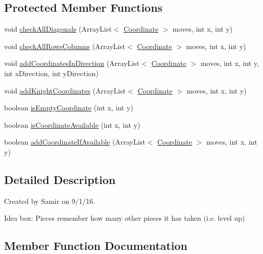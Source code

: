 \subsection*{Protected Member Functions}
\begin{DoxyCompactItemize}
\item 
void \hyperlink{classmain_1_1pieces_1_1_piece_aef1e0909297d1b3fd0974b4be25751c4}{check\+All\+Diagonals} (Array\+List$<$ \hyperlink{classmain_1_1model_1_1_coordinate}{Coordinate} $>$ moves, int x, int y)
\item 
void \hyperlink{classmain_1_1pieces_1_1_piece_ae50779c5a6de51ac05c6469e4660a82b}{check\+All\+Rows\+Columns} (Array\+List$<$ \hyperlink{classmain_1_1model_1_1_coordinate}{Coordinate} $>$ moves, int x, int y)
\item 
void \hyperlink{classmain_1_1pieces_1_1_piece_a12f2f0e6677148c31488ebf6a68cebaf}{add\+Coordinates\+In\+Direction} (Array\+List$<$ \hyperlink{classmain_1_1model_1_1_coordinate}{Coordinate} $>$ moves, int x, int y, int x\+Direction, int y\+Direction)
\item 
void \hyperlink{classmain_1_1pieces_1_1_piece_aae5cab0c47643b395e9c3050705b6fc9}{add\+Knight\+Coordinates} (Array\+List$<$ \hyperlink{classmain_1_1model_1_1_coordinate}{Coordinate} $>$ moves, int x, int y)
\item 
boolean \hyperlink{classmain_1_1pieces_1_1_piece_a74326d9253471ad25f8edb83bec207f6}{is\+Empty\+Coordinate} (int x, int y)
\item 
boolean \hyperlink{classmain_1_1pieces_1_1_piece_a164f24eb41f07fe4cb93d960f24d8638}{is\+Coordinate\+Available} (int x, int y)
\item 
boolean \hyperlink{classmain_1_1pieces_1_1_piece_a44b1600e3e49f6fdcd3dca288db82fd4}{add\+Coordinate\+If\+Available} (Array\+List$<$ \hyperlink{classmain_1_1model_1_1_coordinate}{Coordinate} $>$ moves, int x, int y)
\end{DoxyCompactItemize}


\subsection{Detailed Description}
Created by Samir on 9/1/16.

Idea box\+: Pieces remember how many other pieces it has taken (i.\+e. level up) 

\subsection{Member Function Documentation}
\hypertarget{classmain_1_1pieces_1_1_piece_a44b1600e3e49f6fdcd3dca288db82fd4}{}\label{classmain_1_1pieces_1_1_piece_a44b1600e3e49f6fdcd3dca288db82fd4} 
